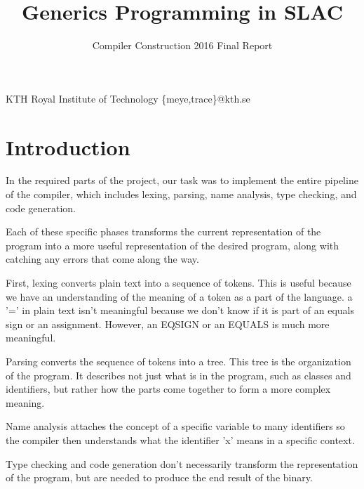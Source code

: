 \documentclass[nocopyrightspace,11pt,authoryear,preprint]{sigplanconf}
\begin{document}


\title{Generics Programming in SLAC}
\subtitle{Compiler Construction 2016 Final Report}

           {KTH Royal Institute of Technology}
           {\{meye,trace\}@kth.se}

\maketitle

\section{Introduction}



In the required parts of the project, our task was to implement the 
entire pipeline of the compiler, which includes 
lexing, parsing, name analysis, type checking, and code generation.

Each of these specific phases transforms the current representation of the 
program into a more useful representation of the desired program, along
with catching any errors that come along the way.

First, lexing converts plain text into a sequence of tokens.  This 
is useful because we have an understanding of the meaning of a token as
a part of the language.  a '=' in plain text isn't meaningful because
we don't know if it is part of an equals sign or an assignment.  However,
an EQSIGN or an EQUALS is much more meaningful.

Parsing converts the sequence of tokens into a tree.  This tree is the
organization of the program.  It describes not just what is in the program, such
as classes and identifiers, but rather how the parts come
together to form a more complex meaning.

Name analysis attaches the concept of a specific variable to many identifiers so
the compiler then understands what the identifier 'x' means in a specific context.

Type checking and code generation don't necessarily transform the representation of the
program, but are needed to produce the end result of the binary.
\end{document}
